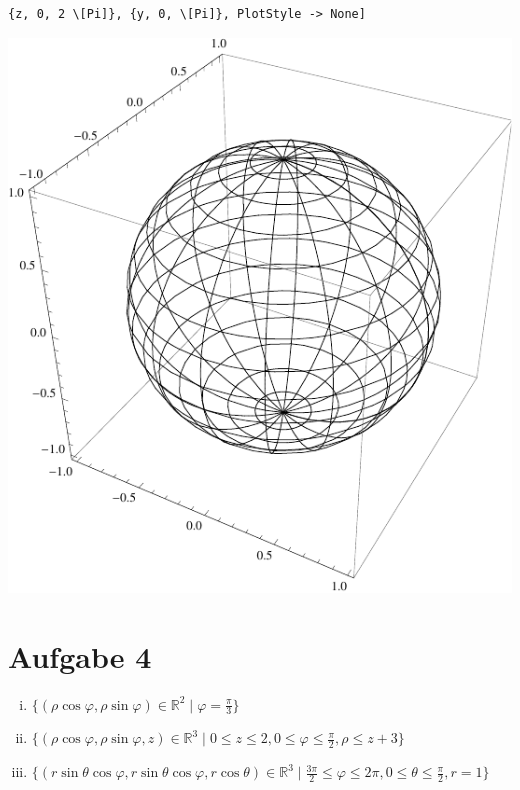 \documentclass[10pt,a4paper,parskip=half]{scrartcl}
\begin{document}
\begin{enumerate}[$\quad$]
\begin{minipage}{0.50\columnwidth}
\begin{lstlisting}[caption= Mathematica Code für den Graph von f]
	{z, 0, 2 \[Pi]}, {y, 0, \[Pi]}, PlotStyle -> None]
	\end{lstlisting}
	\end{minipage}
	\begin{minipage}{0.50\columnwidth}
	\begin{center}
	\includegraphics[scale=0.7]{rkonstant.pdf} 
	\end{center}
	\end{minipage}

\end{enumerate}
\section*{Aufgabe 4}
\begin{enumerate}[(i)]
\item
$\lbrace (\rho \cos \varphi, \rho \sin \varphi) \in \mathbb{R}^2 \mid \varphi = \frac{\pi}{3} \rbrace$
\item
$\lbrace (\rho \cos \varphi, \rho \sin \varphi, z) \in \mathbb{R}^3 \mid 0 \le z \le 2, 0 \le \varphi \le \frac{\pi}{2}, \rho \le z + 3\rbrace$
\item
$\lbrace (r \sin \theta \cos \varphi, r \sin \theta \cos \varphi, r \cos \theta ) \in \mathbb{R}^3 \mid \frac{3\pi}{2} \le \varphi \le 2\pi, 0
\le \theta \le \frac{\pi}{2}, r = 1\rbrace$
\end{enumerate}
\end{document}
